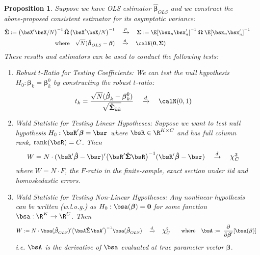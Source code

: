 \documentclass[12pt]{article}
\theoremstyle{plain}
\newtheorem{prop}[thm]{Proposition}
\theoremstyle{definition}
\theoremstyle{remark}
\newcommand*{\Chi}{\mbox{\large$\chi$}} %
\newcommand{\ra}{\rightarrow}
\newcommand{\bsSigma}{\boldsymbol{\Sigma}}
\newcommand{\bsbeta}{\boldsymbol{\beta}}
\newcommand{\bsOmega}{\boldsymbol{\Omega}}
\newcommand{\bshatbeta}{\boldsymbol{\hat{\beta}}}
\newcommand{\bshatSigma}{\boldsymbol{\hat{\Sigma}}}
\newcommand{\bshatOmega}{\boldsymbol{\hat{\Omega}}}
\renewcommand{\bso}{\boldsymbol{0}}
\newcommand{\rank}{\operatorname{rank}}
\newcommand{\pto}{\xrightarrow{P}}
\newcommand{\dto}{\xrightarrow{d}}
\begin{document}
\begin{prop}
\label{prop:asymptoticinference}
Suppose we have OLS estimator $\bshatbeta_{OLS}$ and we construct the
above-proposed consistent estimator for its asymptotic variance:
\begin{align}
  \bshatSigma :=
  \left(\bsX'\bsX/N\right)^{-1}
  \bshatOmega
  \left(\bsX'\bsX/N\right)^{-1}
  \quad&\pto\quad
  \bsSigma :=
  \E[\bsx_n\bsx_n']^{-1}\;\bsOmega\;\E[\bsx_n\bsx_n']^{-1}
  \notag\\
  \text{where}\quad
  \sqrt{N}(\bshatbeta_{OLS} - \bsbeta)
  \quad &\dto \quad
  \calN(\bso,\bsSigma)
  \label{trobust}
\end{align}
These results and estimators can be used to conduct the following tests:
\begin{enumerate}
  \item \emph{Robust $t$-Ratio for Testing Coefficients}: We can
    test the null hypothesis $H_0:\bsbeta_k = \bsbeta_k^0$
    by constructing the
    \emph{robust $t$-ratio}:
    \begin{align*}
      t_k =
      \frac{\sqrt{N}(\bshatbeta_k-\bsbeta_k^0)}{\sqrt{\bshatSigma_{kk}}}
      \quad\dto \quad \calN(0,1)
    \end{align*}

  \item \emph{Wald Statistic for Testing Linear Hypotheses}:
    Suppose we want to test null hypothesis
    $H_0: \bsR'\bsbeta = \bsr$
    where $\bsR \in \R^{K \times C}$
    and has full column rank,
    $\rank(\bsR) = C$.
    Then
    \begin{align*}
      W = N\cdot
      (\bsR'\bshatbeta-\bsr)'
      \big(
      \bsR'\bshatSigma\bsR
      \big)^{-1}
      (\bsR'\bshatbeta-\bsr)
      \quad\dto\quad
      \Chi^2_C
    \end{align*}
    where $W = N\cdot F$, the $F$-ratio in the finite-sample, exact
    section under iid and homoskedastic errors.

  \item \emph{Wald Statistic for Testing Non-Linear Hypotheses}:
    Any nonlinear hypothesis can be written (w.l.o.g.) as
    $H_0: \bsa(\bsbeta) = \bso$ for some function $\bsa:\R^K\ra \R^C$.
    Then
    \begin{align*}
      W :=
      N \cdot \bsa(\bshatbeta_{OLS})'
      \big(
      \bsA \bshatSigma \bsA'
      \big)^{-1}
      \bsa(\bshatbeta_{OLS})
      \quad&\dto\quad
      \Chi^2_C
      \qquad
      \text{where} \quad
      \bsA := \; \frac{\partial}{\partial \bsbeta'}[\bsa(\bsbeta)]
    \end{align*}
    i.e. $\bsA$ is the derivative of $\bsa$ evaluated at true parameter
    vector $\bsbeta$.


\end{enumerate}
\end{prop}
\end{document}

